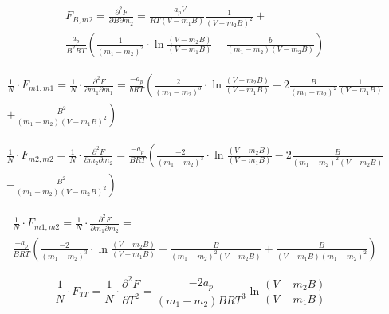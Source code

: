 \documentclass[a4paper, 12pt, english, sintefheadings, sintefcolour]{sintefmemo}
\begin{document}
\noindent\hrulefill

\begin{equation}
\begin{split}
&F_{B,m2}=\frac{\partial^2 F}{\partial B \partial m_2}=\frac{-a_pV}{RT(V-m_1B)}\frac{1}{(V-m_2B)^2}+\\
&\frac{a_p}{B^2RT}\left( \frac{1}{(m_1-m_2)^2}\cdot \ln{\frac{(V-m_2B)}{(V-m_1B)}}-\frac{b}{(m_1-m_2)(V-m_2B)} \right)
\end{split}
\end{equation}

\noindent\hrulefill

\begin{equation}
\begin{split}
&\frac{1}{N}\cdot F_{m1,m1}=\frac{1}{N}\cdot\frac{\partial^2 F}{\partial m_1 \partial m_1}=\frac{-a_p}{bRT}\left( \frac{2}{(m_1-m_2)^3}\cdot\ln{\frac{(V-m_2B)}{(V-m_1B)}}-2\frac{B}{(m_1-m_2)^2}\frac{1}{(V-m_1B)} \right.\\
&\left. +\frac{B^2}{(m_1-m_2)(V-m_1B)^2} \right)
\end{split}
\end{equation}

\noindent\hrulefill

\begin{equation}
\begin{split}
&\frac{1}{N}\cdot F_{m2,m2}=\frac{1}{N}\cdot\frac{\partial^2 F}{\partial m_2 \partial m_2}=\frac{-a_p}{BRT}\left(\frac{-2}{(m_1-m_2)^3}\cdot\ln{\frac{(V-m_2B)}{(V-m_1B)}}-2\frac{B}{(m_1-m_2)^2(V-m_2B)} \right.\\
&\left. -\frac{B^2}{(m_1-m_2)(V-m_2B)^2}  \right)
\end{split}
\end{equation}

\noindent\hrulefill

\begin{equation}
\begin{split}
&\frac{1}{N}\cdot F_{m1,m2}=\frac{1}{N}\cdot\frac{\partial^2 F}{\partial m_1 \partial m_2}=  \\
&\frac{-a_p}{BRT}\left(\frac{-2}{(m_1-m_2)^3}\cdot\ln{\frac{(V-m_2B)}{(V-m_1B)}}+\frac{B}{(m_1-m_2)^2(V-m_2B)}+\frac{B}{(V-m_1B)(m_1-m_2)^2}\right)
\end{split}
\end{equation}

\noindent\hrulefill

\begin{equation}
\frac{1}{N}\cdot F_{TT}=\frac{1}{N}\cdot \frac{\partial^2 F}{\partial T^2}=\frac{-2a_p}{(m_1-m_2)BRT^3}\ln{\frac{(V-m_2B)}{(V-m_1B)}}
\end{equation}
\end{document}
